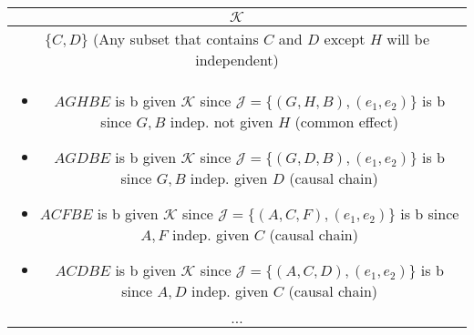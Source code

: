 \begin{example}
    \begin{center}
        \begin{tabular}{c}
            \toprule
            $\mathcal{K}$ \\
            \midrule
            $\{C,D\}$ (Any subset that contains $C$ and $D$ except $H$ will be independent) \\
            \multicolumn{1}{p{\linewidth}}{
                \begin{itemize}
                    \item $AGHBE$ is b given $\mathcal{K}$ since $\mathcal{J} = \{(G,H,B),(e_1,e_2)\}$ is b since $G,B$ indep. not given $H$ (common effect)
                    \item $AGDBE$ is b given $\mathcal{K}$ since $\mathcal{J} = \{(G,D,B),(e_1,e_2)\}$ is b since $G,B$ indep. given $D$ (causal chain)
                    \item $ACFBE$ is b given $\mathcal{K}$ since $\mathcal{J} = \{(A,C,F),(e_1,e_2)\}$ is b since $A,F$ indep. given $C$ (causal chain)
                    \item $ACDBE$ is b given $\mathcal{K}$ since $\mathcal{J} = \{(A,C,D),(e_1,e_2)\}$ is b since $A,D$ indep. given $C$ (causal chain)
                \end{itemize}} \\
            \midrule
            $\ldots$ \\
            \toprule
        \end{tabular}
    \end{center}
\end{example}
\newpage


